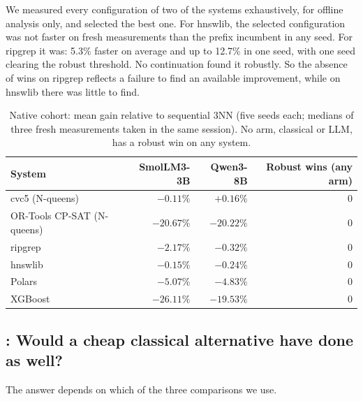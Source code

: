 We measured every configuration of two of the systems exhaustively, for offline analysis only, and selected the best one. For hnswlib, the selected configuration was not faster on fresh measurements than the prefix incumbent in any seed. For ripgrep it was: 5.3\% faster on average and up to 12.7\% in one seed, with one seed clearing the robust threshold. No continuation found it robustly. So the absence of wins on ripgrep reflects a failure to find an available improvement, while on hnswlib there was little to find.

\begin{table}[t]
\centering
\caption{Native cohort: mean gain relative to sequential 3NN (five seeds each; medians of three fresh measurements taken in the same session). No arm, classical or LLM, has a robust win on any system.}
\label{tab:native}
\small
\begin{tabular}{lrrr}
\toprule
System & SmolLM3-3B & Qwen3-8B & Robust wins (any arm) \\
\midrule
cvc5 (N-queens) & $-0.11\%$ & $+0.16\%$ & 0 \\
OR-Tools CP-SAT (N-queens) & $-20.67\%$ & $-20.22\%$ & 0 \\
ripgrep & $-2.17\%$ & $-0.32\%$ & 0 \\
hnswlib & $-0.15\%$ & $-0.24\%$ & 0 \\
Polars & $-5.07\%$ & $-4.83\%$ & 0 \\
XGBoost & $-26.11\%$ & $-19.53\%$ & 0 \\
\bottomrule
\end{tabular}
\end{table}

\subsection{: Would a cheap classical alternative have done as well?}
\label{sec:rq2}

The answer depends on which of the three comparisons we use.

